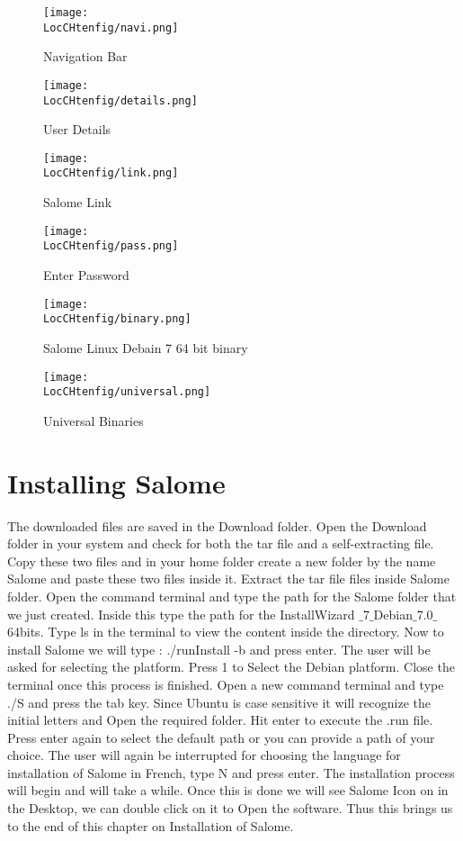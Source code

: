 \begin{figure}[h]  
\centering
\texttt{[image: \\LocCHtenfig/navi.png]}
\caption{Navigation Bar}
\label{navi}
\end{figure}

\begin{figure}[h]  
\centering
\texttt{[image: \\LocCHtenfig/details.png]}
\caption{User Details}
\label{details}
\end{figure}

\begin{figure}[h]  
\centering
\texttt{[image: \\LocCHtenfig/link.png]}
\caption{Salome Link}
\label{link}
\end{figure}

\begin{figure}[h]  
\centering
\texttt{[image: \\LocCHtenfig/pass.png]}
\caption{Enter Password}
\label{pass}
\end{figure}

\begin{figure}[h]  
\centering
\texttt{[image: \\LocCHtenfig/binary.png]}
\caption{Salome Linux Debain 7 64 bit binary}
\label{binary}
\end{figure}

\begin{figure}[h]  
\centering
\texttt{[image: \\LocCHtenfig/universal.png]}
\caption{Universal Binaries}
\label{univ}
\end{figure}

\section{Installing Salome}

The downloaded files are saved in the Download folder. Open the Download folder in your system and check for both the tar file and a self-extracting file.
Copy these two files and in your home folder create a new folder by the name Salome and paste these two files inside it. Extract the tar file files inside Salome folder. Open the command terminal and type the path for the Salome folder that we just created. Inside this type the path for the InstallWizard $\_$7$\_$Debian$\_$7.0$\_$64bits. Type ls in the terminal to view the content inside the directory. Now to install Salome we will type :
./runInstall -b and press enter. The user will be asked for selecting the platform. Press 1 to Select the Debian platform. Close the  terminal once this process is finished. Open a new command terminal and type ./S and press the tab key. Since Ubuntu is case sensitive it will recognize the initial letters and Open the required folder. Hit enter to execute the .run file. Press enter again to select the default path or you can provide a path of your choice. The user will again be interrupted for choosing the language for installation of Salome in French, type N and press enter. The installation process will begin and will take a while. Once this is done we will see Salome Icon on in the Desktop, we can double click on it to Open the software. Thus this brings us to the end of this chapter on Installation of Salome. 




